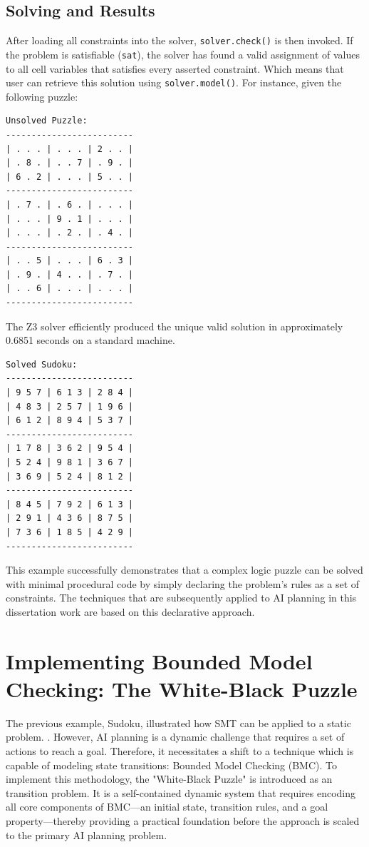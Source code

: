 \documentclass[12pt, a4paper, oneside]{report} %
\begin{document}
\subsection{Solving and Results}
After loading all constraints into the solver, \texttt{solver.check()} is then invoked. If the problem is satisfiable (\texttt{sat}), the solver has found a valid assignment of values to all cell variables that satisfies every asserted constraint. Which means that user can retrieve this solution using \texttt{solver.model()}. For instance, given the following puzzle:
\begin{verbatim}
Unsolved Puzzle:
-------------------------
| . . . | . . . | 2 . . |
| . 8 . | . . 7 | . 9 . |
| 6 . 2 | . . . | 5 . . |
-------------------------
| . 7 . | . 6 . | . . . |
| . . . | 9 . 1 | . . . |
| . . . | . 2 . | . 4 . |
-------------------------
| . . 5 | . . . | 6 . 3 |
| . 9 . | 4 . . | . 7 . |
| . . 6 | . . . | . . . |
-------------------------
\end{verbatim}
The Z3 solver efficiently produced the unique valid solution in approximately 0.6851 seconds on a standard machine.
\begin{verbatim}
Solved Sudoku:
-------------------------
| 9 5 7 | 6 1 3 | 2 8 4 |
| 4 8 3 | 2 5 7 | 1 9 6 |
| 6 1 2 | 8 9 4 | 5 3 7 |
-------------------------
| 1 7 8 | 3 6 2 | 9 5 4 |
| 5 2 4 | 9 8 1 | 3 6 7 |
| 3 6 9 | 5 2 4 | 8 1 2 |
-------------------------
| 8 4 5 | 7 9 2 | 6 1 3 |
| 2 9 1 | 4 3 6 | 8 7 5 |
| 7 3 6 | 1 8 5 | 4 2 9 |
-------------------------
\end{verbatim}
This example successfully demonstrates that a complex logic puzzle can be solved with minimal procedural code by simply declaring the problem's rules as a set of constraints. The techniques that are subsequently applied to AI planning in this dissertation work are based on this declarative approach.
\section{Implementing Bounded Model Checking: The White-Black Puzzle}

The previous example, Sudoku, illustrated how SMT can be applied to a static problem. . However, AI planning is a dynamic challenge that requires a set of actions to reach a goal. Therefore, it necessitates a shift to a technique which is capable of modeling state transitions: Bounded Model Checking (BMC). To implement this methodology, the "White-Black Puzzle" is introduced as an transition problem. It is a self-contained dynamic system that requires encoding all core components of BMC—an initial state, transition rules, and a goal property—thereby providing a practical foundation before the approach is scaled to the primary AI planning problem.
\end{document}
